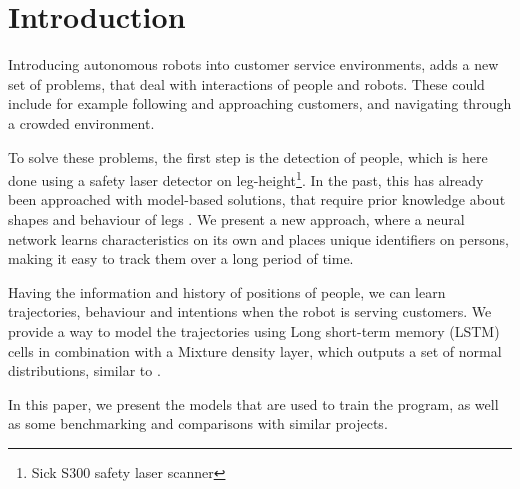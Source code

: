 \section{Introduction}

Introducing autonomous robots into customer service environments, adds a new set of problems, that deal with interactions of people and robots. These could include for example following and approaching customers, and navigating through a crowded environment. 

To solve these problems, the first step is the detection of people, which is here done using a safety laser detector on leg-height\footnote{Sick S300 safety laser scanner}. In the past, this has already been approached with model-based solutions, that require prior knowledge about shapes and behaviour of legs \cite{Arras07usingboosted} \cite{weinrich2014people}.
We present a new approach, where a neural network learns characteristics on its own and places unique identifiers on persons, making it easy to track them over a long period of time.

Having the information and history of positions of people, we can learn trajectories, behaviour and intentions when the robot is serving customers. We provide a way to model the trajectories using Long short-term memory (LSTM) cells in combination with a Mixture density layer, which outputs a set of normal distributions, similar to \cite{bishop1994mixture} \cite{graves2013generating}.

In this paper, we present the models that are used to train the program, as well as some benchmarking and comparisons with similar projects.